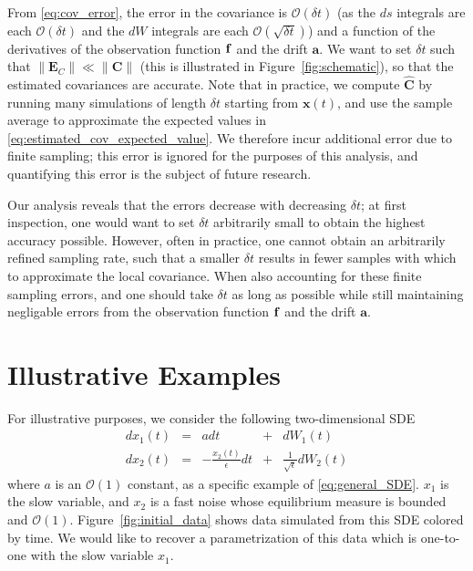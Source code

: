 %
From \eqref{eq:cov_error}, the error in the covariance is $\mathcal{O}(\delta t)$ (as the $ds$ integrals are each $\mathcal{O}(\delta t)$ and the $dW$ integrals are each $\mathcal{O}(\sqrt{\delta t})$) and a function of the derivatives of the observation function $\mathbf{f}$ and the drift $\mathbf{a}$.
%
We want to set $\delta t$ such that $\|\mathbf{E}_C \| \ll \| \mathbf{C} \|$
(this is illustrated in Figure~\ref{fig:schematic}), so that the estimated covariances are accurate.
%
Note that in practice, we compute $\hat{\mathbf{C}}$ by running many simulations of length $\delta t$ starting from $\mathbf{x}(t)$, and use the sample average to approximate the expected values in \eqref{eq:estimated_cov_expected_value}.
%
We therefore incur additional error due to finite sampling; this error is ignored for the purposes of this analysis, and quantifying this error is the subject of future research.

Our analysis reveals that the errors decrease with decreasing $\delta t$; at first inspection, one would want to set $\delta t$ arbitrarily small to obtain the highest accuracy possible.
%
However, often in practice, one cannot obtain an arbitrarily refined sampling rate, such that a smaller $\delta t$ results in fewer samples with which to approximate the local covariance.%
When also accounting for these finite sampling errors, and one should take $\delta t$ as long as possible while still maintaining negligable errors from the observation function $\mathbf{f}$ and the drift $\mathbf{a}$.

\section{Illustrative Examples}

For illustrative purposes, we consider the following two-dimensional SDE
\begin{equation} \label{eq:specific_SDE}
\begin{aligned}
dx_1(t) &=& adt &+& dW_1(t)\\
dx_2(t) &=& -\frac{x_2(t)}{\epsilon} dt &+& \frac{1}{\sqrt{\epsilon}} dW_2(t)
\end{aligned}
\end{equation}
%
where $a$ is an $\mathcal{O}(1)$ constant, as a specific example of \eqref{eq:general_SDE}.
%
$x_1$ is the slow variable, and $x_2$ is a fast noise whose equilibrium measure is bounded and $\mathcal{O}(1)$.
%
Figure~\ref{fig:initial_data} shows data simulated from this SDE colored by time.
%
We would like to recover a parametrization of this data which is one-to-one with the slow variable $x_1$.

